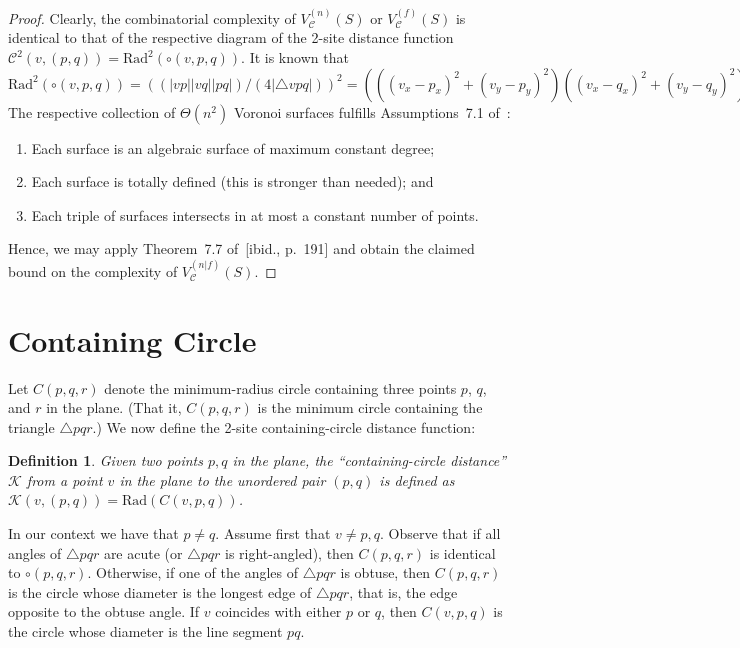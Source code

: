 \documentclass[10pt, conference, compsocconf]{IEEEtran}
\newtheorem{definition}{Definition}
\def\C{{\mathcal C}}
\def\K{{\mathcal K}}
\begin{document}
\begin{proof}
   Clearly, the combinatorial complexity of $V_{\C}^{(n)}(S)$ or
   $V_{\C}^{(f)}(S)$ is identical to that of the respective diagram of
   the 2-site distance function
   $\C^2(v,(p,q)) = \mathrm{Rad}^2(\circ(v,p,q))$.
   It is known that
   $\mbox{Rad}^2(\circ(v,p,q)) =
       ( (|vp| |vq| |pq|)/(4 |\triangle vpq|) )^2 =
       (((v_x-p_x)^2+(v_y-p_y)^2) ((v_x-q_x)^2+(v_y-q_y)^2)
          ((p_x-q_x)^2+(p_y-q_y)^2))/
          (4(v_x(p_y-q_y)-p_x(v_y-q_y)+q_x(v_y-p_y))^2).$
   The respective collection of $\Theta(n^2)$ Voronoi surfaces
   fulfills Assumptions~7.1 of~\cite[p.~188]{SA95}:
   \begin{enumerate}
   \item Each surface is an algebraic surface of maximum constant degree;
   \item Each surface is totally defined (this is stronger than needed); and
   \item Each triple of surfaces intersects in at most a constant number
         of points.
   \end{enumerate}
   Hence, we may apply Theorem~7.7 of~[ibid., p.~191] and
   obtain the claimed bound on the complexity of $V_{\C}^{(n|f)}(S)$.
\end{proof}



\section{Containing Circle}

\label{S-contain-cir}

Let $C(p,q,r)$ denote the minimum-radius circle
containing three points $p$, $q$, and $r$ in the plane.
(That it, $C(p,q,r)$ is the minimum circle containing the triangle
$\triangle pqr$.)
We now define the 2-site containing-circle distance function:
\begin{definition}
   Given two points $p,q$ in the plane, the ``containing-circle distance''
   $\K$ from a point $v$ in the plane to the unordered pair $(p,q)$ is
   defined as $\K(v,(p,q)) = \mathrm{Rad}(C(v,p,q))$.
\end{definition}

In our context we have that $p \neq q$.
Assume first that $v \ne p,q$.
Observe that if all angles of $\triangle pqr$ are acute (or $\triangle pqr$
is right-angled), then $C(p,q,r)$ is identical to $\circ(p,q,r)$.
Otherwise, if one of the angles of $\triangle pqr$ is obtuse, then
$C(p,q,r)$ is the circle whose diameter is the longest edge of
$\triangle pqr$, that is, the edge opposite to the obtuse angle.
If $v$ coincides with either $p$ or $q$, then $C(v,p,q)$ is the circle
whose diameter is the line segment $pq$.
\end{document}
